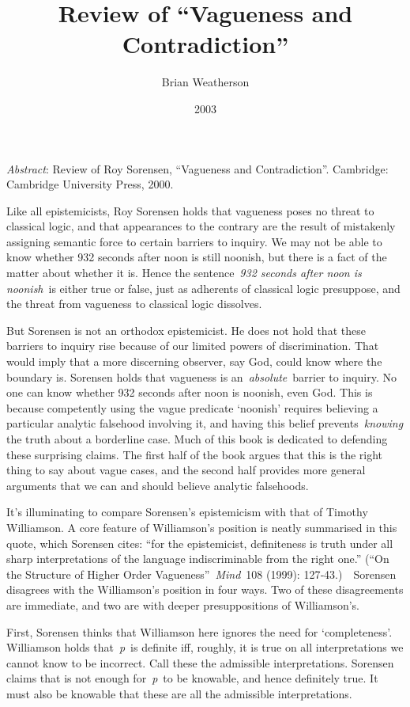 \documentclass[
  11pt,
  letterpaper,
  DIV=11,
  numbers=noendperiod,
  twoside]{scrartcl}
\title{Review of ``Vagueness and Contradiction''}
\author{Brian Weatherson}
\date{2003}
\renewenvironment{abstract}
 {\vspace{-1.25cm}
 \quotation\small\noindent\emph{Abstract}:}
 {\endquotation}
\begin{document}
\maketitle
\begin{abstract}
Review of Roy Sorensen, ``Vagueness and Contradiction''. Cambridge:
Cambridge University Press, 2000.
\end{abstract}


Like all epistemicists, Roy Sorensen holds that vagueness poses no
threat to classical logic, and that appearances to the contrary are the
result of mistakenly assigning semantic force to certain barriers to
inquiry. We may not be able to know whether 932 seconds after noon is
still noonish, but there is a fact of the matter about whether it is.
Hence the sentence~\emph{932 seconds after noon is noonish}~is either
true or false, just as adherents of classical logic presuppose, and the
threat from vagueness to classical logic dissolves.

But Sorensen is not an orthodox epistemicist. He does not hold that
these barriers to inquiry rise because of our limited powers of
discrimination. That would imply that a more discerning observer, say
God, could know where the boundary is. Sorensen holds that vagueness is
an~\emph{absolute}~barrier to inquiry. No one can know whether 932
seconds after noon is noonish, even God. This is because competently
using the vague predicate `noonish' requires believing a particular
analytic falsehood involving it, and having this belief
prevents~\emph{knowing} the truth about a borderline case. Much of this
book is dedicated to defending these surprising claims. The first half
of the book argues that this is the right thing to say about vague
cases, and the second half provides more general arguments that we can
and should believe analytic falsehoods.

It's illuminating to compare Sorensen's epistemicism with that of
Timothy Williamson. A core feature of Williamson's position is neatly
summarised in this quote, which Sorensen cites: ``for the epistemicist,
definiteness is truth under all sharp interpretations of the language
indiscriminable from the right one.'' (``On the Structure of Higher
Order Vagueness''~\emph{Mind}~108 (1999): 127‑43.)~~Sorensen disagrees
with the Williamson's position in four ways. Two of these disagreements
are immediate, and two are with deeper presuppositions of Williamson's.

First, Sorensen thinks that Williamson here ignores the need for
`completeness'. Williamson holds that~\emph{p}~is definite iff, roughly,
it is true on all interpretations we cannot know to be incorrect. Call
these the admissible interpretations. Sorensen claims that is not enough
for~\emph{p}~to be knowable, and hence definitely true. It must also be
knowable that these are all the admissible interpretations.
\end{document}
